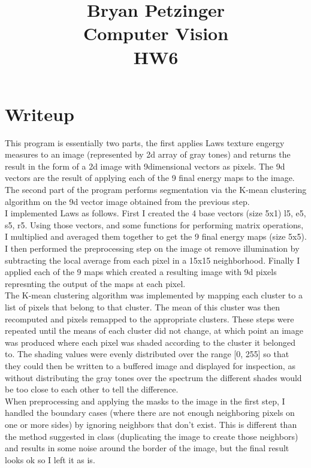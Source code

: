 \documentclass[12pt]{article}
\title{
Bryan Petzinger \\
Computer Vision \\
HW6 \\
}
\begin{document}
\section{Writeup}
This program is essentially two parts, the first applies Laws texture engergy measures to an image (represented by 2d array of gray tones) and returns the result in the form of a 2d image with 9dimensional vectors as pixels. The 9d vectors are the result of applying each of the 9 final energy maps to the image. The second part of the program performs segmentation via the K-mean clustering algorithm on the 9d vector image obtained from the previous step. \\

I implemented Laws as follows. First I created the 4 base vectors (size 5x1) l5, e5, s5, r5. Using those vectors, and some functions for performing matrix operations, I multiplied and averaged them together to get the 9 final energy maps (size 5x5). I then performed the preprocessing step on the image ot remove illumination by subtracting the local average from each pixel in a 15x15 neighborhood. Finally I applied each of the 9 maps which created a resulting image with 9d pixels represnting the output of the maps at each pixel. \\

The K-mean clustering algorithm was implemented by mapping each cluster to a list of pixels that belong to that cluster. The mean of this cluster was then recomputed and pixels remapped to the appropriate clusters. These steps were repeated until the means of each cluster did not change, at which point an image was produced where each pixel was shaded according to the cluster it belonged to. The shading values were evenly distributed over the range [0, 255] so that they could then be written to a buffered image and displayed for inspection, as without distributing the gray tones over the spectrum the different shades would be too close to each other to tell the difference. \\

When preprocessing and applying the masks to the image in the first step, I handled the boundary cases (where there are not enough neighboring pixels on one or more sides) by ignoring neighbors that don't exist. This is different than the method suggested in class (duplicating the image to create those neighbors) and results in some noise around the border of the image, but the final result looks ok so I left it as is. \\
\end{document}
